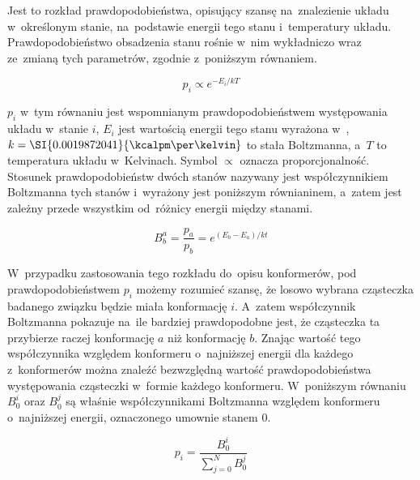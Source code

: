 Jest to rozkład prawdopodobieństwa, opisujący szansę na~znalezienie układu w~określonym stanie,
  na~podstawie energii tego stanu i~temperatury układu.
Prawdopodobieństwo obsadzenia stanu rośnie w~nim wykładniczo wraz ze~zmianą tych parametrów,
  zgodnie z~poniższym równaniem.

\begin{equation}
  p_i \propto e^{-E_i/kT}
\end{equation}

$p_i$ w~tym równaniu jest wspomnianym prawdopodobieństwem występowania układu w~stanie $i$,
  $E_i$ jest wartością energii tego stanu wyrażona w~\si{\kcalpm},
  $k = \SI{0.0019872041}{\kcalpm\per\kelvin}$ to stała Boltzmanna,
  a~$T$ to temperatura układu w~Kelvinach.
Symbol $\propto$ oznacza proporcjonalność.
Stosunek prawdopodobieństw dwóch stanów nazywany jest współczynnikiem Boltzmanna tych stanów
  i~wyrażony jest poniższym równianinem, a~zatem jest zależny przede wszystkim od~różnicy
  energii między stanami.

\begin{equation}
  B^a_b = \frac{p_a}{p_b} = e^{(E_b-E_a)/kt}
\end{equation}

W~przypadku zastosowania tego rozkładu do~opisu konformerów, pod prawdopodobieństwem $p_i$
  możemy rozumieć szansę, że losowo wybrana cząsteczka badanego związku będzie miała
  konformację $i$.
A~zatem współczynnik Boltzmanna pokazuje na~ile bardziej prawdopodobne jest, że cząsteczka
  ta przybierze raczej konformację $a$ niż konformację $b$.
Znając wartość tego współczynnika względem konformeru o~najniższej energii dla każdego
  z~konformerów można znaleźć bezwzględną wartość prawdopodobieństwa występowania cząsteczki
  w~formie każdego konformeru.
W~poniższym równaniu $B^i_0$ oraz $B^j_0$ są właśnie współczynnikami Boltzmanna względem
  konformeru o~najniższej energii, oznaczonego umownie stanem $0$.

\begin{equation}
  p_i = \frac{B^i_0}{\sum\limits^N_{j=0}B^j_0}
\end{equation}

